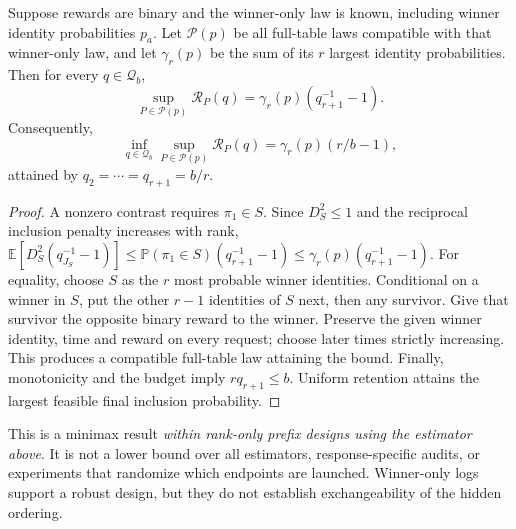 \documentclass[12pt]{clear2027}
\newcommand{\E}{\mathbb{E}}
\newcommand{\Prb}{\mathbb{P}}
\newcommand{\calQ}{\mathcal{Q}}
\begin{document}
\begin{theorem}\label{thm:winner}
Suppose rewards are binary and the winner-only law is known, including winner identity probabilities $p_a$. Let $\mathcal P(p)$ be all full-table laws compatible with that winner-only law, and let $\gamma_r(p)$ be the sum of its $r$ largest identity probabilities. Then for every $q\in\calQ_b$,
\begin{equation}
 \sup_{P\in\mathcal P(p)}\mathcal R_P(q)
 =\gamma_r(p)(q_{r+1}^{-1}-1).\label{eq:winner}
\end{equation}
Consequently,
\begin{equation}
 \inf_{q\in\calQ_b}\sup_{P\in\mathcal P(p)}\mathcal R_P(q)
 =\gamma_r(p)(r/b-1),\label{eq:minimax}
\end{equation}
attained by $q_2=\cdots=q_{r+1}=b/r$.
\end{theorem}
\begin{proof}
A nonzero contrast requires $\pi_1\in S$. Since $D_S^2\le1$ and the reciprocal inclusion penalty increases with rank,
$\E[D_S^2(q_{J_S}^{-1}-1)]\le\Prb(\pi_1\in S)(q_{r+1}^{-1}-1)\le\gamma_r(p)(q_{r+1}^{-1}-1)$.
For equality, choose $S$ as the $r$ most probable winner identities. Conditional on a winner in $S$, put the other $r-1$ identities of $S$ next, then any survivor. Give that survivor the opposite binary reward to the winner. Preserve the given winner identity, time and reward on every request; choose later times strictly increasing. This produces a compatible full-table law attaining the bound. Finally, monotonicity and the budget imply $rq_{r+1}\le b$. Uniform retention attains the largest feasible final inclusion probability.
\end{proof}

This is a minimax result \emph{within rank-only prefix designs using the estimator above}. It is not a lower bound over all estimators, response-specific audits, or experiments that randomize which endpoints are launched. Winner-only logs support a robust design, but they do not establish exchangeability of the hidden ordering.
\end{document}
